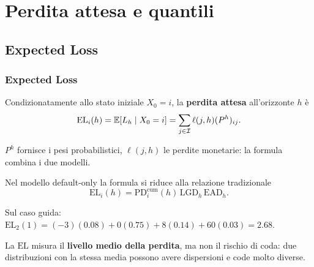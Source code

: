 



\section{Perdita attesa e quantili}

\subsection{Expected Loss}%

\begin{frame}%
%

\frametitle{Expected Loss}%
%

%


Condizionatamente allo stato iniziale $X_{0}=i$, la \textbf{perdita attesa}
all'orizzonte $h$ \`{e}
\[
\mathrm{EL}_{i}(h) = \mathbb{E}[L_h\mid X_0=i] = \sum_{j\in\mathcal{I}}
\ell(j,h)(P^{h})_{ij}.
\]


\medskip

\begin{stepitemize}
\item $P^{h}$ fornisce i pesi probabilistici, $\ell(j,h)$ le perdite
monetarie: la formula combina i due modelli.

\item Nel modello default-only la formula si riduce alla relazione
tradizionale
\[
\mathrm{EL}_{i}(h) = \mathrm{PD}_{i}^{\mathrm{cum}}(h)\, \mathrm{LGD}_{h}\,
\mathrm{EAD}_{h}.
\]


\item Sul caso guida: $\mathrm{EL}_{2}(1)=(-3)(0.08)+0(0.75)
+8(0.14)+60(0.03)=2.68$.

\item La $\mathrm{EL}$ misura il \textbf{livello medio della perdita}, ma non
il rischio di coda: due distribuzioni con la stessa media possono avere
dispersioni e code molto diverse.
\end{stepitemize}

%

\transboxout
\end{frame}%



